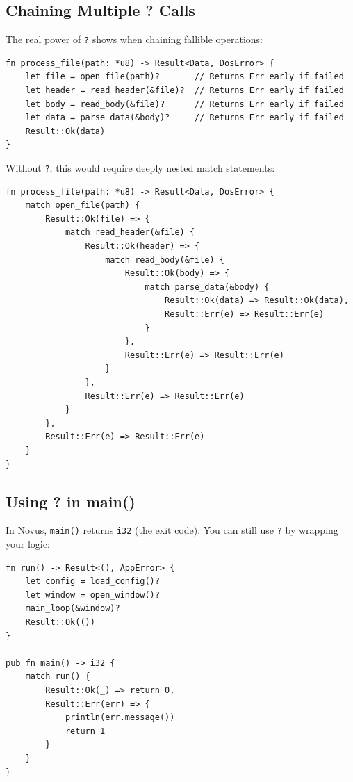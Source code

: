 \subsection{Chaining Multiple ? Calls}

The real power of \texttt{?} shows when chaining fallible operations:

\begin{lstlisting}
fn process_file(path: *u8) -> Result<Data, DosError> {
    let file = open_file(path)?       // Returns Err early if failed
    let header = read_header(&file)?  // Returns Err early if failed
    let body = read_body(&file)?      // Returns Err early if failed
    let data = parse_data(&body)?     // Returns Err early if failed
    Result::Ok(data)
}
\end{lstlisting}

Without \texttt{?}, this would require deeply nested match statements:

\begin{lstlisting}
fn process_file(path: *u8) -> Result<Data, DosError> {
    match open_file(path) {
        Result::Ok(file) => {
            match read_header(&file) {
                Result::Ok(header) => {
                    match read_body(&file) {
                        Result::Ok(body) => {
                            match parse_data(&body) {
                                Result::Ok(data) => Result::Ok(data),
                                Result::Err(e) => Result::Err(e)
                            }
                        },
                        Result::Err(e) => Result::Err(e)
                    }
                },
                Result::Err(e) => Result::Err(e)
            }
        },
        Result::Err(e) => Result::Err(e)
    }
}
\end{lstlisting}

\subsection{Using ? in main()}

In Novus, \texttt{main()} returns \texttt{i32} (the exit code). You can still use \texttt{?} by wrapping your logic:

\begin{lstlisting}
fn run() -> Result<(), AppError> {
    let config = load_config()?
    let window = open_window()?
    main_loop(&window)?
    Result::Ok(())
}

pub fn main() -> i32 {
    match run() {
        Result::Ok(_) => return 0,
        Result::Err(err) => {
            println(err.message())
            return 1
        }
    }
}
\end{lstlisting}

